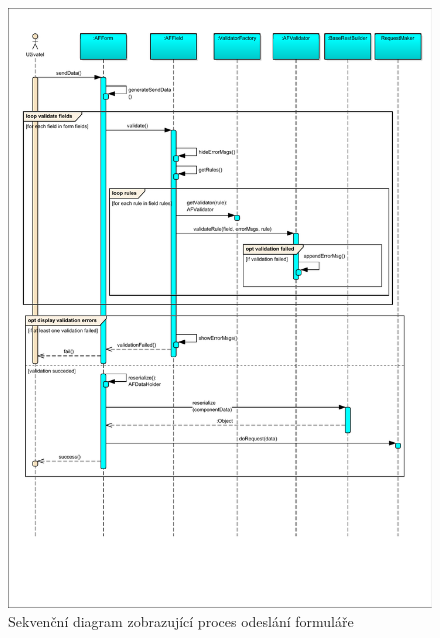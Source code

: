 \begin{figure}
\begin{center}
\includegraphics[width=\textwidth, height=\textheight, keepaspectratio, trim=4 4 4 4, clip]{figures/sequenceSendForm}
\caption{Sekvenční diagram zobrazující proces odeslání formuláře}
\label{img:sdFormSend}
\end{center}
\end{figure}

